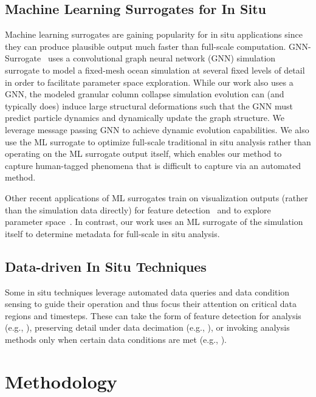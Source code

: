 \documentclass{vgtc}
\begin{document}
\subsection{Machine Learning Surrogates for In Situ}

Machine learning surrogates are gaining popularity for in situ applications since they can produce plausible output much faster than full-scale computation. GNN-Surrogate~\cite{shi22gnn} uses a convolutional graph neural network (GNN) simulation surrogate to model a fixed-mesh ocean simulation at several fixed levels of detail in order to facilitate parameter space exploration. While our work also uses a GNN, the modeled granular column collapse simulation evolution can (and typically does) induce large structural deformations such that the GNN must predict particle dynamics and dynamically update the graph structure. We leverage message passing GNN to achieve dynamic evolution capabilities. We also use the ML surrogate to optimize full-scale traditional in situ analysis rather than operating on the ML surrogate output itself, which enables our method to capture human-tagged phenomena that is difficult to capture via an automated method.

Other recent applications of ML surrogates train on visualization outputs (rather than the simulation data directly) for feature detection~\cite{dutta18insitu} and to explore parameter space~\cite{he20insitunet}. In contrast, our work uses an ML surrogate of the simulation itself to determine metadata for full-scale in situ analysis. 

\subsection{Data-driven In Situ Techniques}
Some in situ techniques leverage automated data queries and data condition sensing to guide their operation and thus focus their attention on critical data regions and timesteps. These can take the form of feature detection for analysis (e.g., \cite{dutta18insitu}), preserving detail under data decimation  (e.g., \cite{wang17sampling,biswas2018situ,biswas21sampling}), or invoking analysis methods only when certain data conditions are met (e.g., \cite{bennett2016trigger,larsen2018flexible,lawson21insitu}).


\section{Methodology}
\label{sec:method}
\end{document}
